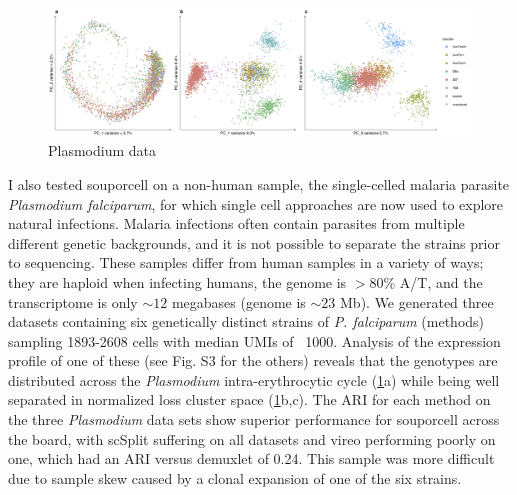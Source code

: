 \begin{figure}[htbp!]
\caption{Plasmodium data}
\label{figure:malaria}
\begin{centering}
\includegraphics[width=\textwidth]{malaria.jpg} 
\end{centering}
\end{figure}

\par{
I also tested souporcell on a non-human sample, the single-celled malaria parasite \textit{Plasmodium falciparum}, for which single cell approaches are now used to explore natural infections\cite{MCA}. Malaria infections often contain parasites from multiple different genetic backgrounds, and it is not possible to separate the strains prior to sequencing. These samples differ from human samples in a variety of ways; they are haploid when infecting humans, the genome is $>80$\% A/T, and the transcriptome is only $\sim12$ megabases (genome is $\sim23$ Mb). We generated three datasets containing six genetically distinct strains of \textit{P. falciparum} (methods) sampling 1893-2608 cells with median UMIs of ~1000. Analysis of the expression profile of one of these (see Fig. S3 for the others) reveals that the genotypes are distributed across the \textit{Plasmodium} intra-erythrocytic cycle (\ref{figure:malaria}a) while being well separated in normalized loss cluster space (\ref{figure:malaria}b,c). The ARI for each method on the three \textit{Plasmodium} data sets show superior performance for souporcell across the board, with scSplit suffering on all datasets and vireo performing poorly on one, which had an ARI versus demuxlet of 0.24. This sample was more difficult due to sample skew caused by a clonal expansion of one of the six strains.
} 


